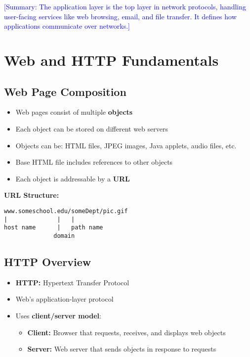 \documentclass[12pt]{article}
\begin{document}
\textcolor{blue}{[Summary: The application layer is the top layer in network protocols, handling user-facing services like web browsing, email, and file transfer. It defines how applications communicate over networks.]}

\section{Web and HTTP Fundamentals}

\subsection{Web Page Composition}
\begin{itemize}
    \item Web pages consist of multiple \textbf{objects}
    \item Each object can be stored on different web servers
    \item Objects can be: HTML files, JPEG images, Java applets, audio files, etc.
    \item Base HTML file includes references to other objects
    \item Each object is addressable by a \textbf{URL}
\end{itemize}

\textbf{URL Structure:}
\begin{verbatim}
www.someschool.edu/someDept/pic.gif
|              |   |
host name      |   path name
              domain
\end{verbatim}

\subsection{HTTP Overview}
\begin{itemize}
    \item \textbf{HTTP:} Hypertext Transfer Protocol
    \item Web's application-layer protocol
    \item Uses \textbf{client/server model}:
          \begin{itemize}
              \item \textbf{Client:} Browser that requests, receives, and displays web objects
              \item \textbf{Server:} Web server that sends objects in response to requests
          \end{itemize}
\end{itemize}
\end{document}

